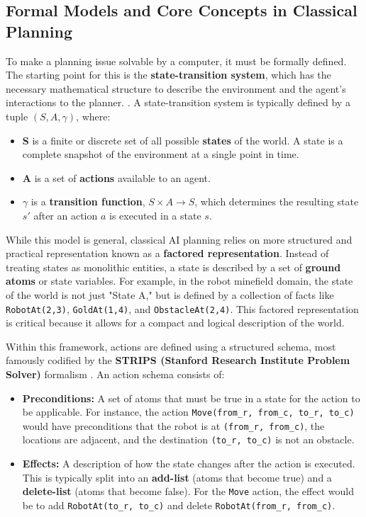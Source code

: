 \documentclass[12pt, a4paper, oneside]{report} %
\begin{document}
\subsection{Formal Models and Core Concepts in Classical Planning}
To make a planning issue solvable by a computer, it must be formally defined. The starting point for this is the \textbf{state-transition system}, which has the necessary mathematical structure to describe the environment and the agent's interactions to the planner. \cite{bonet2001planning}.
A state-transition system is typically defined by a tuple $(S, A, \gamma)$, where:
\begin{itemize}
    \item \textbf{S} is a finite or discrete set of all possible \textbf{states} of the world. A state is a complete snapshot of the environment at a single point in time.
    \item \textbf{A} is a set of \textbf{actions} available to an agent.
    \item \textbf{$\gamma$} is a \textbf{transition function}, $S \times A \to S$, which determines the resulting state $s'$ after an action $a$ is executed in a state $s$.
\end{itemize}

While this model is general, classical AI planning relies on more structured and practical representation known as a \textbf{factored representation}. Instead of treating states as monolithic entities, a state is described by a set of \textbf{ground atoms} or state variables. For example, in the robot minefield domain, the state of the world is not just "State A," but is defined by a collection of facts like \texttt{RobotAt(2,3)}, \texttt{GoldAt(1,4)}, and \texttt{ObstacleAt(2,4)}. This factored representation is critical because it allows for a compact and logical description of the world.

Within this framework, actions are defined using a structured schema, most famously codified by the \textbf{STRIPS (Stanford Research Institute Problem Solver)} formalism \cite{Aiello2024}. An action schema consists of:
\begin{itemize}
    \item \textbf{Preconditions:} A set of atoms that must be true in a state for the action to be applicable. For instance, the action \texttt{Move(from\_r, from\_c, to\_r, to\_c)} would have preconditions that the robot is at \texttt{(from\_r, from\_c)}, the locations are adjacent, and the destination \texttt{(to\_r, to\_c)} is not an obstacle.
    \item \textbf{Effects:} A description of how the state changes after the action is executed. This is typically split into an \textbf{add-list} (atoms that become true) and a \textbf{delete-list} (atoms that become false). For the \texttt{Move} action, the effect would be to add \texttt{RobotAt(to\_r, to\_c)} and delete \texttt{RobotAt(from\_r, from\_c)}.
\end{itemize}
\end{document}
